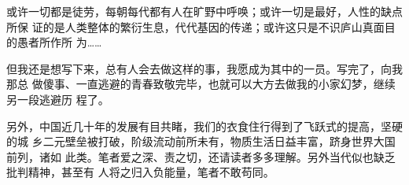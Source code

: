 或许一切都是徒劳，每朝每代都有人在旷野中呼唤；或许一切是最好，人性的缺点所保
证的是人类整体的繁衍生息，代代基因的传递；或许这只是不识庐山真面目的愚者所作所
为……

但我还是想写下来，总有人会去做这样的事，我愿成为其中的一员。写完了，向我那总
做傻事、一直逃避的青春致敬完毕，也就可以大方去做我的小家幻梦，继续另一段逃避历
程了。

另外，中国近几十年的发展有目共睹，我们的衣食住行得到了飞跃式的提高，坚硬的城
乡二元壁垒被打破，阶级流动前所未有，物质生活日益丰富，跻身世界大国前列，诸如
此类。笔者爱之深、责之切，还请读者多多理解。另外当代似也缺乏批判精神，甚至有
人将之归入负能量，笔者不敢苟同。














